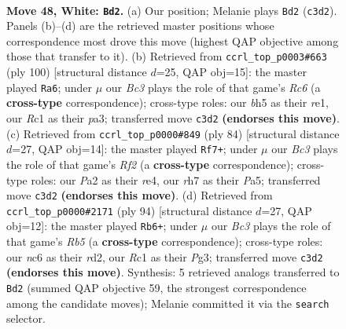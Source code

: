 \documentclass[11pt]{article}
\begin{document}
\clearpage

\begin{figure}[p]\centering
\begin{subfigure}{0.46\textwidth}\centering
\resizebox{\linewidth}{!}{%
\newchessgame
\chessboard[
  setfen={6k1/7r/p1n2P2/7b/1P6/2B5/P5K1/2R5 w - - 1 48},
  showmover=false,
  pgfstyle=straightmove, color=movearrow, markmove={c3-d2}
]}
\caption{}
\end{subfigure}\hfill
\begin{subfigure}{0.46\textwidth}\centering
\resizebox{\linewidth}{!}{%
\newchessgame
\chessboard[
  setfen={4kb2/8/2R3p1/2P3P1/5B2/p4K1P/8/4r3 w - - 0 51},
  showmover=false,
  pgfstyle=straightmove, color=movearrow, markmove={c6-a6}
]}
\caption{}
\end{subfigure}
\\[4pt]
\begin{subfigure}{0.46\textwidth}\centering
\resizebox{\linewidth}{!}{%
\newchessgame
\chessboard[
  setfen={6r1/7k/pB6/P3b3/4r3/8/5R1P/3R3K w - - 1 43},
  showmover=false,
  pgfstyle=straightmove, color=movearrow, markmove={f2-f7}
]}
\caption{}
\end{subfigure}\hfill
\begin{subfigure}{0.46\textwidth}\centering
\resizebox{\linewidth}{!}{%
\newchessgame
\chessboard[
  setfen={8/8/5k1p/1R1Bnp2/8/1P4PP/3r4/6K1 w - - 5 48},
  showmover=false,
  pgfstyle=straightmove, color=movearrow, markmove={b5-b6}
]}
\caption{}
\end{subfigure}
\caption{\textbf{Move 48, White: \texttt{Bd2}.} (a) Our position; Melanie plays \texttt{Bd2} (\texttt{c3d2}). Panels (b)--(d) are the retrieved master positions whose correspondence most drove this move (highest QAP objective among those that transfer to it). (b) Retrieved from \texttt{ccrl\_top\_p0003\#663} (ply 100) [structural distance $d$=25, QAP obj=15]: the master played \texttt{Ra6}; under $\mu$ our \emph{Bc3} plays the role of that game's \emph{Rc6} (a \textbf{cross-type} correspondence); cross-type roles: our \emph{b}h5 as their \emph{r}e1, our \emph{R}c1 as their \emph{p}a3; transferred move \texttt{c3d2} \textbf{(endorses this move)}. (c) Retrieved from \texttt{ccrl\_top\_p0000\#849} (ply 84) [structural distance $d$=27, QAP obj=14]: the master played \texttt{Rf7+}; under $\mu$ our \emph{Bc3} plays the role of that game's \emph{Rf2} (a \textbf{cross-type} correspondence); cross-type roles: our \emph{P}a2 as their \emph{r}e4, our \emph{r}h7 as their \emph{P}a5; transferred move \texttt{c3d2} \textbf{(endorses this move)}. (d) Retrieved from \texttt{ccrl\_top\_p0000\#2171} (ply 94) [structural distance $d$=27, QAP obj=12]: the master played \texttt{Rb6+}; under $\mu$ our \emph{Bc3} plays the role of that game's \emph{Rb5} (a \textbf{cross-type} correspondence); cross-type roles: our \emph{n}c6 as their \emph{r}d2, our \emph{R}c1 as their \emph{P}g3; transferred move \texttt{c3d2} \textbf{(endorses this move)}. Synthesis: 5 retrieved analogs transferred to \texttt{Bd2} (summed QAP objective 59, the strongest correspondence among the candidate moves); Melanie committed it via the \texttt{search} selector.}
\label{fig:thought-m94}
\end{figure}
\end{document}
